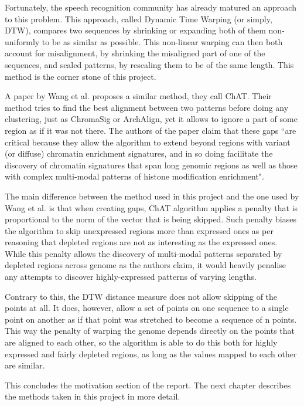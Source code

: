 \documentclass[parskip]{cs4rep}
\begin{document}
Fortunately, the speech recognition community has already matured an approach to this problem. This approach, called Dynamic Time Warping (or simply, DTW), compares two sequences by shrinking or expanding both of them non-uniformly to be as similar as possible. This non-linear warping can then both account for misalignment, by shrinking the misaligned part of one of the sequences, and scaled patterns, by rescaling them to be of the same length. This method is the corner stone of this project.

A paper by Wang et al. \citep{Wang:2012cb} proposes a similar method, they call ChAT.
Their method tries to find the best alignment between two patterns before doing any clustering, just as ChromaSig or ArchAlign, yet it allows to ignore a part of some region as if it was not there. The authors of the paper claim that these gaps ``are critical because they allow the algorithm to extend beyond regions with variant (or diffuse) chromatin enrichment signatures, and in so doing facilitate the discovery of chromatin signatures that span long genomic regions as well as those with complex multi-modal patterns of histone modification enrichment". 

The main difference between the method used in this project and the one used by Wang et al. is that when creating gaps, ChAT algorithm applies a penalty that is proportional to the norm of the vector that is being skipped. Such penalty biases the algorithm to skip unexpressed regions more than expressed ones as per reasoning that depleted regions are not as interesting as the expressed ones. 
While this penalty allows the discovery of multi-modal patterns separated by depleted regions across genome as the authors claim, it would heavily penalise any attempts to discover highly-expressed patterns of varying lengths.

Contrary to this, the DTW distance measure does not allow skipping of the points at all. It does, however, allow a set of points on one sequence to a single point on another as if that point was stretched to become a sequence of n points. This way the penalty of warping the genome depends directly on the points that are aligned to each other, so the algorithm is able to do this both for highly expressed and fairly depleted regions, as long as the values mapped to each other are similar.


This concludes the motivation section of the report. The next chapter describes the methods taken in this project in more detail.
\end{document}
